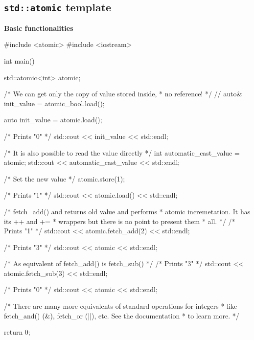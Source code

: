 \documentclass[../main]{subfiles}
\begin{document}
\subsection{\texttt{std::atomic} template}
    \textbf{Basic functionalities}
\begin{Code}
    #include <atomic>
    #include <iostream>

    int main()
    {
        std::atomic<int> atomic;

        /* We can get only the copy of value stored inside,
         * no reference!
         */
        // auto& init_value = atomic_bool.load();

        auto init_value = atomic.load();

        /* Prints "0" */
        std::cout << init_value << std::endl;

        /* It is also possible to read the value directly */
        int automatic_cast_value = atomic;
        std::cout << automatic_cast_value << std::endl;

        /* Set the new value */
        atomic.store(1);

        /* Prints "1" */
        std::cout << atomic.load() << std::endl;

        /* fetch_add() and returns old value and performs
         * atomic incremetation. It has its ++ and +=
         * wrappers but there is no point to present them
         * all.
         */
        /* Prints "1" */
        std::cout << atomic.fetch_add(2) << std::endl;

        /* Prints "3" */
        std::cout << atomic << std::endl;

        /* As equivalent of fetch_add() is fetch_sub() */
        /* Prints "3" */
        std::cout << atomic.fetch_sub(3) << std::endl;

        /* Prints "0" */
        std::cout << atomic << std::endl;

        /* There are many more equivalents of standard operations for integers
         * like fetch_and() (&), fetch_or (||), etc. See the documentation
         * to learn more.
        */

        return 0;
    }
\end{Code}
\end{document}

